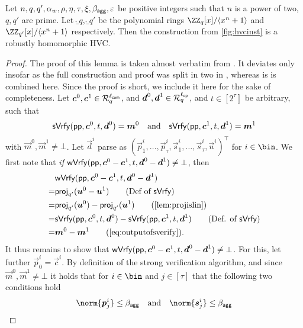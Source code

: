 \begin{lemma}\label{lem:hvcrobhom}
  Let $n,q,q',\alpha_w,\rho,\eta,\tau,\xi,\beta_{\mathsf{agg}},\varepsilon$ be positive integers such that $n$ is a power of two, $q,q'$ are prime.
  Let $\ring_q,\ring_{q'}$ be the polynomial rings $\ZZ_q[x]/\langle x^n+1\rangle$ and $\ZZ_{q'}[x]/\langle x^n+1\rangle$ respectively.
  Then the construction from \autoref{fig:hvcinst} is a robustly homomorphic HVC.
\end{lemma}
\begin{proof}
The proof of this lemma is taken almost verbatim from \cite{CCS:FleSimZha22}.
It deviates only insofar as the full construction and proof was split in two in \cite{CCS:FleSimZha22}, whereas is is combined here.
Since the proof is short, we include it here for the sake of completeness.
Let $\boldsymbol{c}^0,\boldsymbol{c}^1 \in \mathcal{R}_q^{\ell_{\mathsf{com}}}$, and $\boldsymbol{d}^0, \boldsymbol{d}^1 \in \mathcal{R}_q^{\ell_{\mathsf{op}}}$, and $t\in[2^\tau]$ be arbitrary, such that
\begin{equation}
    \mathsf{sVrfy}(\mathsf{pp},\boldsymbol{c}^0, t,\boldsymbol{d}^0)=\boldsymbol{m}^0 \quad \text{and} \quad \mathsf{sVrfy}(\mathsf{pp},\boldsymbol{c}^1, t,\boldsymbol{d}^1)=\boldsymbol{m}^1\label{eq:outputofsverify}
\end{equation}
with $\vec{m}^0,\vec{m}^1\neq \bot$.
Let $\vec{d}^i$ parse as $(\vec{p}^i_1,\dots,\vec{p}^i_{\tau},\vec{s}^i_1, \dots, \vec{s}^i_{\tau},\vec{u}^i)^\intercal$ for $i\in\bin$.
We first note that \emph{if} $\mathsf{wVrfy}(\mathsf{pp},\boldsymbol{c}^0-\boldsymbol{c}^1, t,\boldsymbol{d}^0-\boldsymbol{d}^1)\neq\bot$, then
\begin{align*}
  &\wverify(\params,\vec{c}^0-\vec{c}^1, t,\vec{d}^0-\vec{d}^1)\\
  =&\proj_{q'}(\vec{u}^0-\vec{u}^1)\tag{Def of $\sverify$}\\
  =&\proj_{q'}(\vec{u}^0)-\proj_{q'}(\vec{u}^1)\tag{\autoref{lem:projislin}}\\
  =&\sverify(\params,\vec{c}^0, t,\vec{d}^0)-\sverify(\params,\vec{c}^1, t,\vec{d}^1)\tag{Def. of $\sverify$}\\
  =&\vec{m}^0- \vec{m}^1 \tag{\autoref{eq:outputofsverify}}.
\end{align*}
%
It thus remains to show that $\mathsf{wVrfy}(\mathsf{pp},\boldsymbol{c}^0-\boldsymbol{c}^1, t,\boldsymbol{d}^0-\boldsymbol{d}^1)\neq\bot$.
For this, let further $\vec{p}^i_0 = \vec{c}^i$.
By definition of the strong verification algorithm, and since $\vec{m}^0,\vec{m}^1\neq\bot$ it holds that for $i\in\bin$ 
and $j \in [\tau]$ that the following two conditions hold
\begin{align}
  \norm{\vec{p}^i_{j}} \leq \bagg\quad\text{and}\quad
  \norm{\vec{s}^i_{j}} \leq \bagg\label{eq:robhomnormcheck}\\

\end{align}
\end{proof}
